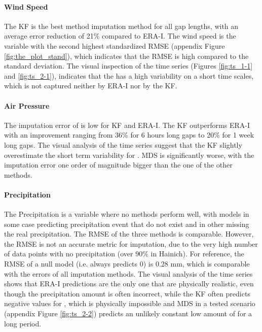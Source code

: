 \documentclass{article}
\begin{document}
\paragraph{Wind Speed} The KF is the best method imputation method for all gap lengths, with an average error reduction of 21\% compared to ERA-I. The wind speed is the variable with the second highest standardized RMSE (appendix Figure \ref{fig:the_plot_stand}), which indicates that the RMSE is high compared to the  standard deviation. The visual inspection of the time series (Figures \ref{fig:ts_1-1} and \ref{fig:ts_2-1}), indicates that the  has a high variability on a short time scales, which is not captured neither by ERA-I nor by the KF.

\paragraph{Air Pressure} The imputation error of  is low for KF and ERA-I. The KF outperforms ERA-I with an improvement ranging from 36\% for 6 hours long gaps to 20\% for 1 week long gaps. The visual analysis of the time series suggest that the KF slightly overestimate the short term variability for . MDS is significantly worse, with the imputation error one order of magnitude bigger than the one of the other methods.

\paragraph{Precipitation} The Precipitation is a variable where no methods perform well, with models in some case predicting precipitation event that do not exist and in other missing the real precipitation. The RMSE of the three methods is comparable. However, the RMSE is not an accurate metric for  imputation, due to the very high number of data points with no precipitation (over 90\% in Hainich). For reference, the RMSE of a null model (i.e. always predicts 0) is 0.28 \si{mm}, which is comparable with the errors of all imputation methods.
The visual analysis of the time series shows that ERA-I predictions are the only one that are physically realistic, even though the precipitation amount is often incorrect, while the KF often predicts negative values for , which is physically impossible and MDS in a tested scenario (appendix Figure \ref{fig:ts_2-2}) predicts an unlikely constant low amount of  for a long period.
\end{document}
